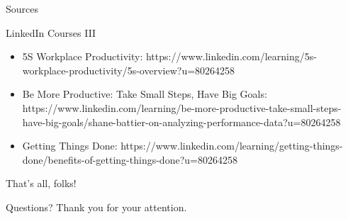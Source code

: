 \begin{frame}{Sources}
  \begin{block}{LinkedIn Courses III}
    \begin{itemize}
      \item 5S Workplace Productivity: https://www.linkedin.com/learning/5s-workplace-productivity/5s-overview?u=80264258
      \item Be More Productive: Take Small Steps, Have Big Goals: https://www.linkedin.com/learning/be-more-productive-take-small-steps-have-big-goals/shane-battier-on-analyzing-performance-data?u=80264258
      \item Getting Things Done: https://www.linkedin.com/learning/getting-things-done/benefits-of-getting-things-done?u=80264258
    \end{itemize}
  \end{block}
\end{frame}

\begin{frame}{That's all, folks!}
  \begin{block}{Questions?}
    Thank you for your attention. 
  \end{block}
\end{frame}

